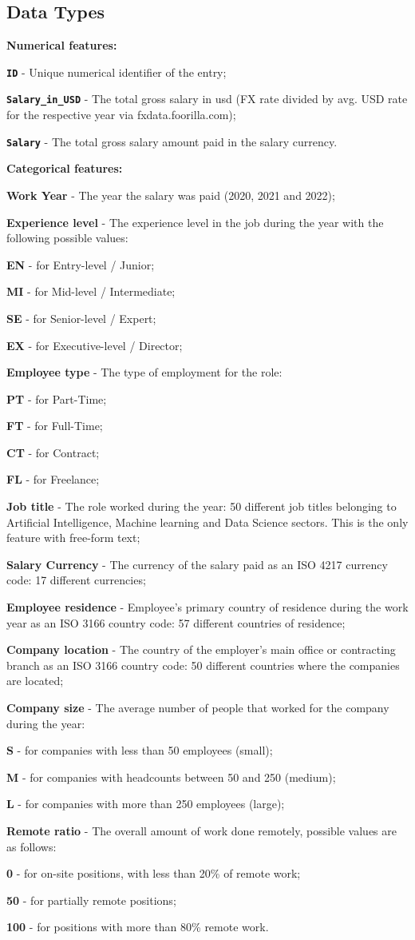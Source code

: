 \documentclass[11pt,a4paper]{article}
\newcommand{\SubItem}[1]{
  {\setlength\itemindent{13pt} \item[◦] #1}
}
\newcommand{\SubSubItem}[1]{
  {\setlength\itemindent{26pt} \item[◦] #1}
}
\begin{document}
\subsection{Data Types} 
\begin{itemize}
\item \textbf{Numerical features:} 
\SubItem{\textbf{\texttt{ID}} - Unique numerical identifier of the entry;}
\SubItem{\textbf{\texttt{Salary\_in\_USD}} - The total gross salary in \acrfull{usd} (FX rate divided by avg. USD rate for the respective year via fxdata.foorilla.com);}
\SubItem{\textbf{\texttt{Salary}} - The total gross salary amount paid in the salary currency.}
\item \textbf{Categorical features:} 
\SubItem{\textbf{Work Year} - The year the salary was paid (2020, 2021 and 2022);}
\SubItem{\textbf{Experience level} - The experience level in the job during the year with the following possible values:}
\SubSubItem{\textbf{EN} - for Entry-level / Junior;}
\SubSubItem{\textbf{MI} - for Mid-level / Intermediate;}
\SubSubItem{\textbf{SE} - for Senior-level / Expert;}
\SubSubItem{\textbf{EX} - for Executive-level / Director;}
\SubItem{\textbf{Employee type} - The type of employment for the role:}
\SubSubItem{\textbf{PT} - for Part-Time;}
\SubSubItem{\textbf{FT} - for Full-Time;}
\SubSubItem{\textbf{CT} - for Contract;}
\SubSubItem{\textbf{FL} - for Freelance;}
\SubItem{\textbf{Job title} - The role worked during the year: 50 different job titles belonging to Artificial Intelligence, Machine learning and Data Science sectors. This is the only feature with free-form text;}
\SubItem{\textbf{Salary Currency} - The currency of the salary paid as an ISO 4217 currency code: 17 different currencies;}
\SubItem{\textbf{Employee residence} - Employee's primary country of residence during the work year as an ISO 3166 country code: 57 different countries of residence;}
\SubItem{\textbf{Company location} - The country of the employer's main office or contracting branch as an ISO 3166 country code: 50 different countries where the companies are located;}
\SubItem{\textbf{Company size} - The average number of people that worked for the company during the year: }
\SubSubItem{\textbf{S} - for companies with less than 50 employees (small);}
\SubSubItem{\textbf{M} - for companies with headcounts between 50 and 250 (medium);}
\SubSubItem{\textbf{L} - for companies with more than 250 employees (large);
}
\SubItem{\textbf{Remote ratio} - The overall amount of work done remotely, possible values are as follows:}
\SubSubItem{\textbf{0} - for on-site positions, with less than 20\% of remote work;}
\SubSubItem{\textbf{50} - for partially remote positions;}
\SubSubItem{\textbf{100} - for positions with more than 80\% remote work.}
\end{itemize}
\end{document}
